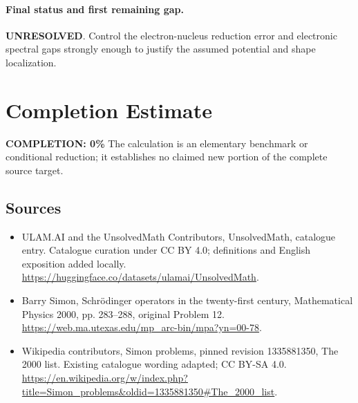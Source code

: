 \documentclass[11pt]{article}
\begin{document}
\paragraph{Final status and first remaining gap.}
\textbf{UNRESOLVED}. Control the electron-nucleus reduction error and electronic spectral gaps strongly enough to justify the assumed potential and shape localization.

\section{Completion Estimate}
\noindent\textbf{COMPLETION: 0\%}
The calculation is an elementary benchmark or conditional reduction; it establishes no claimed new portion of the complete source target.

\subsection{Sources}
\begin{itemize}
\item[\hypertarget{source:statement:1}{S1}] ULAM.AI and the UnsolvedMath Contributors, UnsolvedMath, catalogue entry. Catalogue curation under CC BY 4.0; definitions and English exposition added locally.
\url{https://huggingface.co/datasets/ulamai/UnsolvedMath}.
\item[\hypertarget{source:statement:2}{S2}] Barry Simon, Schrödinger operators in the twenty-first century, Mathematical Physics 2000, pp. 283–288, original Problem 12.
\url{https://web.ma.utexas.edu/mp_arc-bin/mpa?yn=00-78}.
\item[\hypertarget{source:statement:3}{S3}] Wikipedia contributors, Simon problems, pinned revision 1335881350, The 2000 list. Existing catalogue wording adapted; CC BY-SA 4.0.
\url{https://en.wikipedia.org/w/index.php?title=Simon_problems&oldid=1335881350#The_2000_list}.
\end{itemize}
\label{end:statement}
\end{document}
